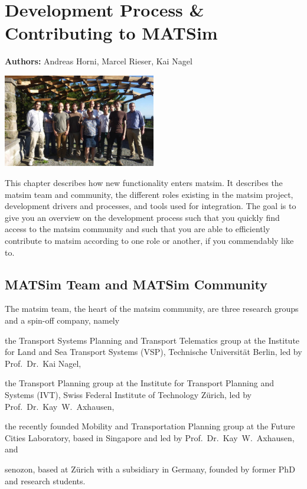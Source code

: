 \chapter{Development Process \& Contributing to MATSim}
\label{ch:developmentprocess}

\hfill \textbf{Authors:} Andreas Horni, Marcel Rieser, Kai Nagel

\begin{center} \includegraphics[width=0.5\textwidth, angle=0]{extending/figures/ConceptualMeetingVillaHatt.png} \end{center}

This chapter describes how new functionality enters \gls{matsim}. It describes the \gls{matsim} team and community, the different roles existing in the \gls{matsim} project, development drivers and processes, and tools used for integration. The goal is to give you an overview on the development process such that you quickly find access to the \gls{matsim} community and such that you are able to efficiently contribute to \gls{matsim} according to one role or another, if you commendably like to.

\section{MATSim Team and MATSim Community}
The \gls{matsim} team, the heart of the \gls{matsim} community, are three research groups and a spin-off company, namely 
\begin{compactitem}
\item the Transport Systems Planning and Transport Telematics group at the Institute for Land and Sea Transport Systems (VSP), Technische Universität Berlin, led by Prof.~Dr.~Kai Nagel,
\item the Transport Planning group at the Institute for Transport Planning and Systems (IVT), Swiss Federal Institute of Technology Zürich, led by Prof.~Dr.~Kay~W.~Axhausen, 
\item the recently founded Mobility and Transportation Planning group at the Future Cities Laboratory, based in Singapore and led by Prof.~Dr.~Kay~W.~Axhausen, and 
\item \gls{senozon}, based at Zürich with a subsidiary in Germany, founded by former PhD and research students. 
\end{compactitem}

